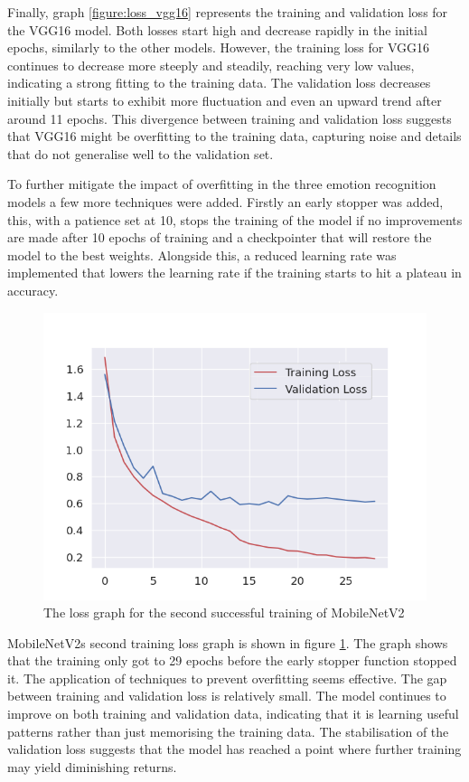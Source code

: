 Finally, graph \ref{figure:loss_vgg16} represents the training and validation loss for the VGG16 model. Both losses start high and decrease rapidly in the initial epochs, similarly to the other models. However, the training loss for VGG16 continues to decrease more steeply and steadily, reaching very low values, indicating a strong fitting to the training data. The validation loss decreases initially but starts to exhibit more fluctuation and even an upward trend after around 11 epochs. This divergence between training and validation loss suggests that VGG16 might be overfitting to the training data, capturing noise and details that do not generalise well to the validation set.

To further mitigate the impact of overfitting in the three emotion recognition models a few more techniques were added. Firstly an early stopper was added, this, with a patience set at 10, stops the training of the model if no improvements are made after 10 epochs of training and a checkpointer that will restore the model to the best weights. Alongside this, a reduced learning rate was implemented that lowers the learning rate if the training starts to hit a plateau in accuracy.

\begin{figure}[H]
    \centering{}
    \includegraphics[scale=0.5]{fed_images/train_loss_MobileNetv2_ofp.png}
    \caption{The loss graph for the second successful training of MobileNetV2}
    \label{figure:loss_mnv2_ofp}
\end{figure}

MobileNetV2s second training loss graph is shown in figure \ref{figure:loss_mnv2_ofp}. The graph shows that the training only got to 29 epochs before the early stopper function stopped it. The application of techniques to prevent overfitting seems effective. The gap between training and validation loss is relatively small. The model continues to improve on both training and validation data, indicating that it is learning useful patterns rather than just memorising the training data. The stabilisation of the validation loss suggests that the model has reached a point where further training may yield diminishing returns.

